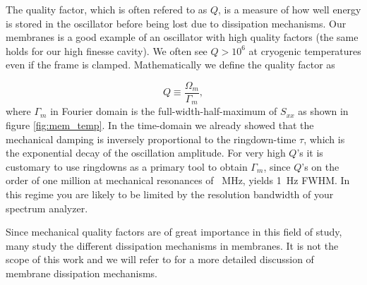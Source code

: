 The quality factor, which is often refered to as $Q$, is a measure of how well energy is stored in the oscillator before being lost due to dissipation mechanisms. Our membranes is a good example of an oscillator with high quality factors (the same holds for our high finesse cavity). We often see $Q > 10^6$ at cryogenic temperatures even if the frame is clamped. Mathematically we define the quality factor as

\begin{equation}
Q \equiv \frac{\Omega_m}{\Gamma_m},
\end{equation}
\noindent
where $\Gamma_m$ in Fourier domain is the full-width-half-maximum of $S_{xx}$ as shown in figure \ref{fig:mem_temp}. In the time-domain we already showed that the mechanical damping is inversely proportional to the ringdown-time $\tau$, which is the exponential decay of the oscillation amplitude. For very high $Q$'s it is customary to use ringdowns as a primary tool to obtain $\Gamma_m$, since $Q$'s on the order of one million at mechanical resonances of \SI{}{\mega\hertz}, yields \SI{1}{\hertz} FWHM. In this regime you are likely to be limited by the resolution bandwidth of your spectrum analyzer.

Since mechanical quality factors are of great importance in this field of study, many study the different dissipation mechanisms in membranes. It is not the scope of this work and we will refer to \cite{barg2014} for a more detailed discussion of membrane dissipation mechanisms.